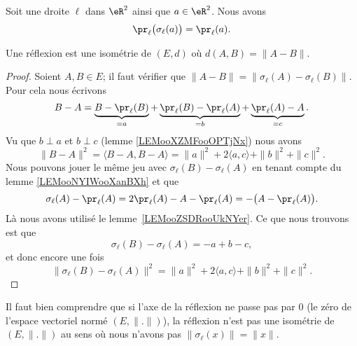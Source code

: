 \begin{lemma}       \label{LEMooNYIWooXanBXh}
	Soit une droite \( \ell\) dans \( \eR^2\) ainsi que \( a\in \eR^2\). Nous avons
	\begin{equation}
		\pr_{\ell}\big( \sigma_{\ell}(a) \big)=\pr_{\ell}(a).
	\end{equation}
\end{lemma}

\begin{proposition}      \label{PROPooFSVEooWmJsnv}
	Une réflexion est une isométrie de \( (E,d)\) où \( d(A,B)=\| A-B \|\).
\end{proposition}

\begin{proof}
	Soient \( A,B\in E\); il faut vérifier que \( \| A-B \|=\| \sigma_{\ell}(A)-\sigma_{\ell}(B) \|\). Pour cela nous écrivons
	\begin{equation}
		B-A=\underbrace{B-\pr_{\ell}(B)}_{=a}+\underbrace{\pr_{\ell}(B)-\pr_{\ell}(A)}_{=b}+\underbrace{\pr_{\ell}(A)-A}_{=c}.
	\end{equation}
	Vu que \( b\perp a\) et \( b\perp c\) (lemme \ref{LEMooXZMFooOPTjNx}) nous avons
	\begin{equation}
		\| B-A \|^2=\langle B-A, B-A\rangle =\| a \|^2+2\langle a, c\rangle +\| b \|^2+\| c \|^2.
	\end{equation}
	Nous pouvons jouer le même jeu avec \( \sigma_{\ell}(B)-\sigma_{\ell}(A)\) en tenant compte du lemme \ref{LEMooNYIWooXanBXh} et que
	\begin{equation}
		\sigma_{\ell}(A)-\pr_{\ell}(A)=2\pr_{\ell}(A)-A-\pr_{\ell}(A)=-\big( A-\pr_{\ell}(A) \big).
	\end{equation}
	Là nous avons utilisé le lemme~\ref{LEMooZSDRooUkNYer}. Ce que nous trouvons est que
	\begin{equation}
		\sigma_{\ell}(B)-\sigma_{\ell}(A)=-a+b-c,
	\end{equation}
	et donc encore une fois
	\begin{equation}
		\| \sigma_{\ell}(B)-\sigma_{\ell}(A) \|^2=\| a \|^2+2\langle a, c\rangle +\| b \|^2+\| c \|^2.
	\end{equation}
\end{proof}

\begin{remark}
	Il faut bien comprendre que si l'axe de la réflexion ne passe pas par \( 0\) (le zéro de l'espace vectoriel normé \( (E,\| . \|)\)), la réflexion n'est pas une isométrie de \( (E,\| . \|)\) au sens où nous n'avons pas \( \| \sigma_{\ell}(x) \|=\| x \|\).
\end{remark}

